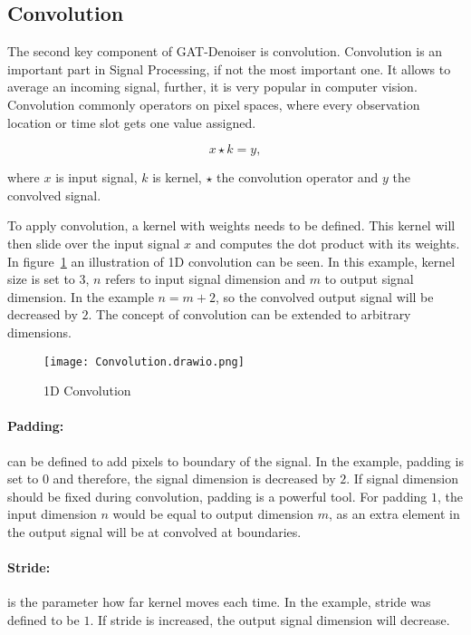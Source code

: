 \subsection{Convolution}
The second key component of GAT-Denoiser is convolution.
Convolution is an important part in Signal Processing, if not the most important one.
It allows to average an incoming signal, further, it is very popular in computer vision.
Convolution commonly operators on pixel spaces, where every observation location or time slot gets one value assigned.

\begin{equation}
  x \star k = y,
\end{equation}

where $x$ is input signal, $k$ is kernel, $\star$ the convolution operator and $y$ the convolved signal.

To apply convolution, a kernel with weights needs to be defined. 
This kernel will then slide over the input signal $x$ and computes the dot product with its weights.
In figure~\ref{fig:1d-convolution} an illustration of 1D convolution can be seen. In this example,
kernel size is set to 3, $n$ refers to input signal dimension and $m$ to output signal dimension.
In the example  $ n = m + 2$, so the convolved output signal will be decreased by $2$.
The concept of convolution can be extended to arbitrary dimensions.

\begin{figure}[H]
  \centering
  \label{fig:1d-convolution}
  \texttt{[image: Convolution.drawio.png]}
  \caption{1D Convolution}
\end{figure}

\paragraph{Padding:} 
can be defined to add pixels to boundary of the signal.
In the example, padding is set to $0$ and therefore, the signal dimension is decreased by $2$.
If signal dimension should be fixed during convolution, padding is a powerful tool. For padding $1$,
the input dimension $n$ would be equal to output dimension $m$, as an extra element in the output signal
will be at convolved at boundaries.


\paragraph{Stride:}
is the parameter how far kernel moves each time. In the example, stride was defined to be $1$.
If stride is increased, the output signal dimension will decrease.


